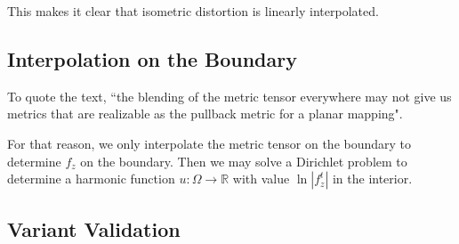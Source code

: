 This makes it clear that isometric distortion is linearly interpolated.



\subsection{Interpolation on the Boundary}

To quote the text, ``the blending of the metric tensor everywhere may not give us metrics that are realizable as the pullback metric for a planar mapping". 

For that reason, we only interpolate the metric tensor on the boundary to determine $f_z$ on the boundary. Then we may solve a Dirichlet problem to determine a harmonic function $u: \Omega \rightarrow \mathbb{R}$ with value $\ln |f_z^t|$ in the interior. %


\subsection{Variant Validation}






